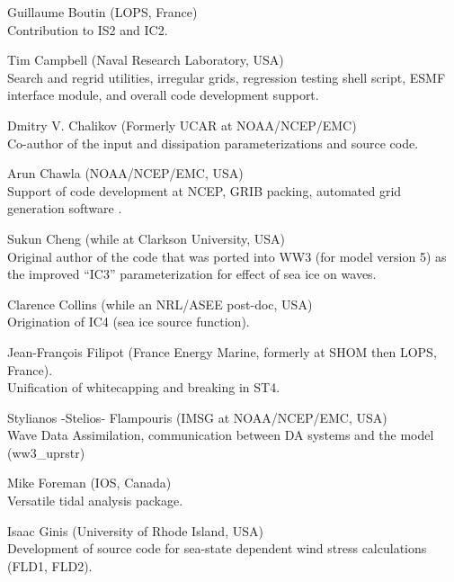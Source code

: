 \begin{list}{\ldots}{ }
\item [Guillaume Boutin] (LOPS, France) \\
  Contribution to IS2 and IC2. 

\item [Tim Campbell] (Naval Research Laboratory, USA)\\ 
  Search and regrid utilities, irregular grids, regression testing shell script, ESMF interface module, 
  and overall code development support.

\item [Dmitry V. Chalikov] (Formerly UCAR at NOAA/NCEP/EMC) \\ Co-author of the
  \cite{tol:JPO96} input and dissipation parameterizations and source code.

\item [Arun Chawla](NOAA/NCEP/EMC, USA) \\
  Support of code development at NCEP, GRIB packing, automated grid generation
  software \citep{tol:MMAB07a, tol:OMOD08a}.

\item [Sukun Cheng] (while at Clarkson University, USA) \\
  Original author of the code that was ported into WW3 (for model version 5) as the improved ``IC3'' parameterization for effect of sea ice on waves.

\item [Clarence Collins] (while an NRL/ASEE post-doc, USA) \\
  Origination of IC4 (sea ice source function).

\item [Jean-Fran{\c c}ois Filipot] (France Energy Marine, formerly at SHOM then LOPS, France).\\
  Unification of whitecapping and breaking in ST4. 

\item [Stylianos -Stelios- Flampouris] (IMSG at NOAA/NCEP/EMC, USA) \\
      Wave Data Assimilation, communication between DA systems and the model (ww3\_uprstr) 

\item [Mike Foreman]  (IOS, Canada) \\
  Versatile tidal analysis package. 

\item [Isaac Ginis] (University of Rhode Island, USA) \\
  Development of source code for sea-state dependent wind stress calculations (FLD1, FLD2).


\end{list}
